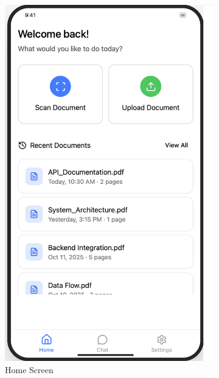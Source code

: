 \documentclass[12pt]{article}
\begin{document}
        \begin{figure}
            \centering
            \begin{subfigure}{0.3\textwidth}
                \includegraphics[width=\textwidth]{img/FrontendHomeTab.png}
                \caption{Home Screen}
                \label{fig:HomeScreen}
            \end{subfigure}
            \hfill
            \begin{subfigure}{0.3\textwidth}

\end{subfigure}
\end{figure}
\end{document}
